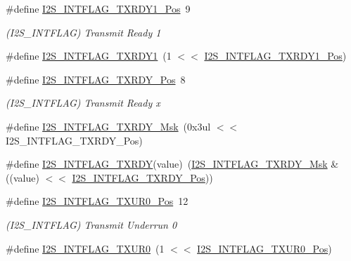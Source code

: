 \begin{DoxyCompactItemize}
\item 
\#define \mbox{\hyperlink{group___s_a_m_d21___i2_s_gaa6d976afb12a4186f3801d42d7f3eaf2}{I2\+S\+\_\+\+I\+N\+T\+F\+L\+A\+G\+\_\+\+T\+X\+R\+D\+Y1\+\_\+\+Pos}}~9
\begin{DoxyCompactList}\small\item\em (I2\+S\+\_\+\+I\+N\+T\+F\+L\+AG) Transmit Ready 1 \end{DoxyCompactList}\item 
\#define \mbox{\hyperlink{group___s_a_m_d21___i2_s_ga33a4f398c668f8bf7c78917d360fc5b3}{I2\+S\+\_\+\+I\+N\+T\+F\+L\+A\+G\+\_\+\+T\+X\+R\+D\+Y1}}~(1 $<$$<$ \mbox{\hyperlink{group___s_a_m_d21___i2_s_gaa6d976afb12a4186f3801d42d7f3eaf2}{I2\+S\+\_\+\+I\+N\+T\+F\+L\+A\+G\+\_\+\+T\+X\+R\+D\+Y1\+\_\+\+Pos}})
\item 
\#define \mbox{\hyperlink{group___s_a_m_d21___i2_s_ga4401102e0bff61291957c9418e23a1b8}{I2\+S\+\_\+\+I\+N\+T\+F\+L\+A\+G\+\_\+\+T\+X\+R\+D\+Y\+\_\+\+Pos}}~8
\begin{DoxyCompactList}\small\item\em (I2\+S\+\_\+\+I\+N\+T\+F\+L\+AG) Transmit Ready x \end{DoxyCompactList}\item 
\#define \mbox{\hyperlink{group___s_a_m_d21___i2_s_ga9ced11c097a854754d75dc3b7733b092}{I2\+S\+\_\+\+I\+N\+T\+F\+L\+A\+G\+\_\+\+T\+X\+R\+D\+Y\+\_\+\+Msk}}~(0x3ul $<$$<$ I2\+S\+\_\+\+I\+N\+T\+F\+L\+A\+G\+\_\+\+T\+X\+R\+D\+Y\+\_\+\+Pos)
\item 
\#define \mbox{\hyperlink{group___s_a_m_d21___i2_s_ga92a388f5139c30094c676e3f5575162d}{I2\+S\+\_\+\+I\+N\+T\+F\+L\+A\+G\+\_\+\+T\+X\+R\+DY}}(value)~(\mbox{\hyperlink{group___s_a_m_d21___i2_s_ga9ced11c097a854754d75dc3b7733b092}{I2\+S\+\_\+\+I\+N\+T\+F\+L\+A\+G\+\_\+\+T\+X\+R\+D\+Y\+\_\+\+Msk}} \& ((value) $<$$<$ \mbox{\hyperlink{group___s_a_m_d21___i2_s_ga4401102e0bff61291957c9418e23a1b8}{I2\+S\+\_\+\+I\+N\+T\+F\+L\+A\+G\+\_\+\+T\+X\+R\+D\+Y\+\_\+\+Pos}}))
\item 
\#define \mbox{\hyperlink{group___s_a_m_d21___i2_s_ga5f0b5fd326750e4e70210add0dd2dce7}{I2\+S\+\_\+\+I\+N\+T\+F\+L\+A\+G\+\_\+\+T\+X\+U\+R0\+\_\+\+Pos}}~12
\begin{DoxyCompactList}\small\item\em (I2\+S\+\_\+\+I\+N\+T\+F\+L\+AG) Transmit Underrun 0 \end{DoxyCompactList}\item 
\#define \mbox{\hyperlink{group___s_a_m_d21___i2_s_gadc982fab08feb2d03387ec5ba8dad4a8}{I2\+S\+\_\+\+I\+N\+T\+F\+L\+A\+G\+\_\+\+T\+X\+U\+R0}}~(1 $<$$<$ \mbox{\hyperlink{group___s_a_m_d21___i2_s_ga5f0b5fd326750e4e70210add0dd2dce7}{I2\+S\+\_\+\+I\+N\+T\+F\+L\+A\+G\+\_\+\+T\+X\+U\+R0\+\_\+\+Pos}})

\end{DoxyCompactItemize}
